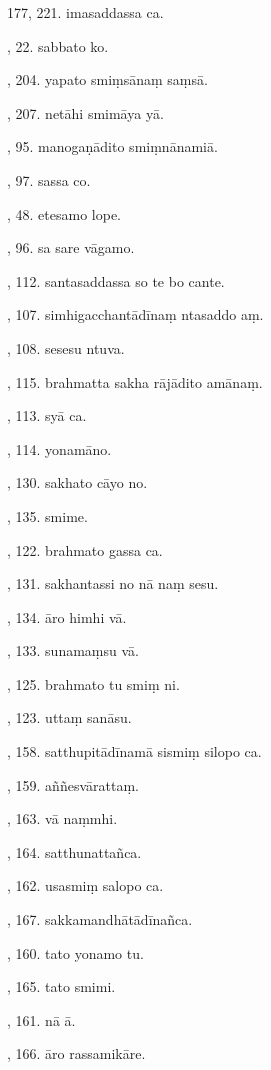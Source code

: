 177, 221. imasaddassa ca.\par {}, 22. sabbato ko.\par {}, 204. yapato smiṃsānaṃ saṃsā.\par {}, 207. netāhi smimāya yā.\par {}, 95. manogaṇādito smiṃnānamiā.\par {}, 97. sassa co.\par {}, 48. etesamo lope.\par {}, 96. sa sare vāgamo.\par {}, 112. santasaddassa so te bo cante.\par {}, 107. simhigacchantādīnaṃ ntasaddo aṃ.\par {}, 108. sesesu ntuva.\par {}, 115. brahmatta sakha rājādito amānaṃ.\par {}, 113. syā ca.\par {}, 114. yonamāno.\par {}, 130. sakhato cāyo no.\par {}, 135. smime.\par {}, 122. brahmato gassa ca.\par {}, 131. sakhantassi no nā naṃ sesu.\par {}, 134. āro himhi vā.\par {}, 133. sunamaṃsu vā.\par {}, 125. brahmato tu smiṃ ni.\par {}, 123. uttaṃ sanāsu.\par {}, 158. satthupitādīnamā sismiṃ silopo ca.\par {}, 159. aññesvārattaṃ.\par {}, 163. vā naṃmhi.\par {}, 164. satthunattañca.\par {}, 162. usasmiṃ salopo ca.\par {}, 167. sakkamandhātādīnañca.\par {}, 160. tato yonamo tu.\par {}, 165. tato smimi.\par {}, 161. nā ā.\par {}, 166. āro rassamikāre.\par \noindent
